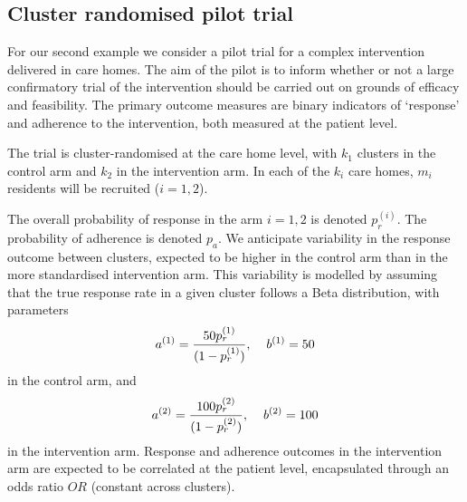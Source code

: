 \documentclass{article} %
\begin{document}

\subsection{Cluster randomised pilot trial}

For our second example we consider a pilot trial for a complex intervention delivered in care homes. The aim of the pilot is to inform whether or not a large confirmatory trial of the intervention should be carried out on grounds of efficacy and feasibility. The primary outcome measures are binary indicators of `response' and adherence to the intervention, both measured at the patient level.

The trial is cluster-randomised at the care home level, with $k_{1}$ clusters in the control arm and $k_{2}$ in the intervention arm. In each of the $k_{i}$ care homes, $m_{i}$ residents will be recruited ($i = 1,2$).

The overall probability of response in the arm $i=1,2$ is denoted $p_{r}^{(i)}$. The probability of adherence is denoted $p_{a}$. We anticipate variability in the response outcome between clusters, expected to be higher in the control arm than in the more standardised intervention arm. This variability is modelled by assuming that the true response rate in a given cluster follows a Beta distribution, with parameters
\begin{equation}
a^{(1)} = \frac{50 p_{r}^{(1)}}{(1-p_{r}^{(1)})}, \hspace{4mm} b^{(1)} = 50
\end{equation}
in the control arm, and
\begin{equation}
a^{(2)} = \frac{100 p_{r}^{(2)}}{(1-p_{r}^{(2)})}, \hspace{4mm} b^{(2)} = 100
\end{equation}
in the intervention arm. Response and adherence outcomes in the intervention arm are expected to be correlated at the patient level, encapsulated through an odds ratio $OR$ (constant across clusters).
\end{document}
